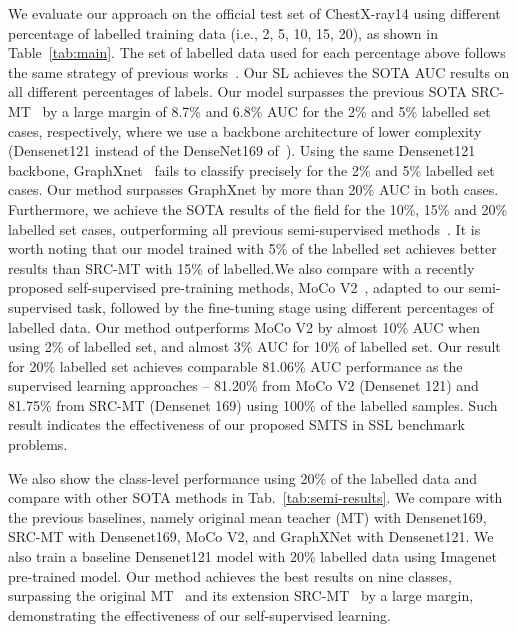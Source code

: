 \documentclass[runningheads]{llncs}
\begin{document}
We evaluate our approach on the official test set of ChestX-ray14
using different percentage of labelled training data (i.e., 2, 5, 10, 15, 20), as shown in Table~\ref{tab:main}. The set of labelled data used for each percentage above follows the same strategy of previous works~\cite{aviles2019graphx,liu2020semi}. 
Our SL achieves the SOTA AUC results on all different percentages of labels. 
Our model surpasses the previous SOTA SRC-MT~\cite{liu2020semi} by a large margin of 8.7\% and 6.8\% AUC  
for the 2\% and 5\% labelled set cases, respectively, where we use a backbone architecture of lower complexity (Densenet121 instead of the DenseNet169 of~\cite{liu2020semi}). Using the same Densenet121 backbone, GraphXnet~\cite{aviles2019graphx} fails to  classify precisely for the 2\% and 5\% labelled set cases. 
Our method surpasses GraphXnet by more than 20\% AUC in both cases. 
Furthermore, we achieve the SOTA results of the field for the 10\%, 15\% and 20\% labelled set cases, outperforming all previous semi-supervised methods~\cite{liu2020semi,aviles2019graphx}. It is worth noting that our model trained with 5\% of the labelled set achieves better results than SRC-MT with 15\% of labelled.We also compare with a recently proposed self-supervised pre-training methods, MoCo V2~\cite{chen2020improved}, adapted to our semi-supervised task,  followed by the fine-tuning stage using different percentages of labelled data.
Our method outperforms MoCo V2 by almost 10\% AUC when using 2\% of labelled set, and almost 3\% AUC for 10\% of labelled set. 
Our result for 20\% labelled set achieves comparable 81.06\% AUC performance as the supervised learning approaches -- 81.20\% from MoCo V2 (Densenet 121) and 81.75\% from SRC-MT (Densenet 169) using 100\% of the labelled samples. Such result indicates the effectiveness of our proposed SMTS in SSL benchmark problems. 

We also show the class-level performance using 20\% of the labelled data and compare with other SOTA methods in Tab.~\ref{tab:semi-results}. We compare with the previous baselines, namely original mean teacher (MT) with Densenet169, SRC-MT with Densenet169, MoCo V2, and GraphXNet with Densenet121. We also train a baseline Densenet121 model with 20\% labelled data using Imagenet pre-trained model. Our method achieves the best results on nine classes, surpassing the original MT~\cite{tarvainen2017mean} and its extension SRC-MT~\cite{liu2020semi} by a large margin, demonstrating the effectiveness of our self-supervised learning. 
\end{document}
